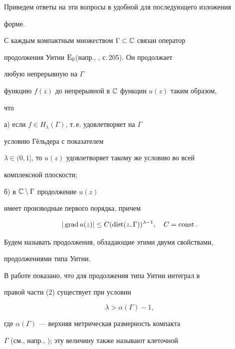 Приведем ответы на эти вопросы в удобной для последующего изложения


форме.





С каждым компактным множеством $\Gamma\subset\Bbb C$ связан оператор


продолжения Уитни $\mathrm{E}_0$\linebreak (напр., \cite{12}, с.\,205). Он продолжает


любую непрерывную на $\Gamma$


функцию $f(z)$ до непрерывной в $\Bbb C$ функции $u(z)$ таким образом,


что





а) если $f\in H_\lambda(\Gamma)$, т.\,е. удовлетворяет на $\Gamma$


условию Г\"ельдера с показателем


$\lambda\in(0,1]$, то $u(z)$ удовлетворяет такому же условию во всей


комплексной плоскости;





б) в $\Bbb C\setminus\Gamma$ продолжение $u(z)$


имеет производные первого порядка, причем


$$


|\grad u(z)|\le C(\dist(z,\Gamma))^{\lambda-1},\quad


C=\const.


$$


Будем называть продолжения, обладающие этими двумя свойствами,


продолжениями типа Уитни.





В работе \cite{7} показано, что для продолжения типа Уитни интеграл в


правой части (2) существует при условии


\begin{equation}


\lambda>\alpha(\Gamma)-1,


\end{equation}


где $\alpha(\Gamma)$ --- верхняя метрическая размерность компакта


$\Gamma$ (см., напр., \cite{13}); эту величину также называют клеточной


